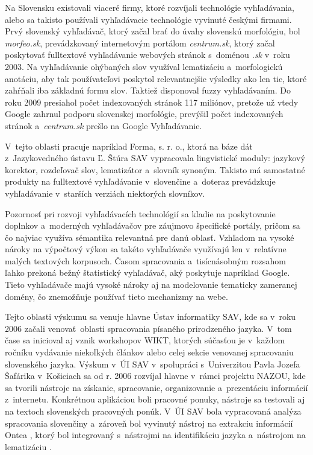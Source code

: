 \begin{multicols}{2}
Na Slovensku existovali viaceré firmy, ktoré rozvíjali
technológie vyhľadávania, alebo sa takisto používali vyhľadávacie technológie
vyvinuté českými firmami. Prvý slovenský vyhľadávač, ktorý začal brať
do úvahy slovenskú morfológiu\cite{f24}, bol \emph{morfeo.sk}, prevádzkovaný
internetovým portálom \emph{centrum.sk}, ktorý začal poskytovať fulltextové
vyhľadávanie webových stránok s~doménou \emph{.sk} v~roku 2003. Na vyhľadávanie
ohýbaných slov využíval lematizáciu a~morfologickú anotáciu, aby tak
používateľovi poskytol relevantnejšie výsledky ako len tie, ktoré zahŕňali iba
základnú formu slov. Taktiež disponoval fuzzy vyhľadávaním. Do roku 2009 presiahol počet
indexovaných stránok 117 miliónov, pretože už vtedy Google zahrnul podporu
slovenskej morfológie, prevýšil počet indexovaných stránok a~\emph{centrum.sk}
prešlo na Google Vyhľadávanie.

V~tejto oblasti pracuje napríklad Forma, s. r. o.\cite{f25}, ktorá na báze dát z~Jazykovedného ústavu Ľ. Štúra SAV vypracovala lingvistické moduly: jazykový korektor, rozdeľovač slov, lematizátor a~slovník synoným. Takisto má samostatné produkty na fulltextové vyhľadávanie v~slovenčine a~doteraz prevádzkuje vyhľadávanie v~starších verziách niektorých slovníkov.

Pozornosť pri rozvoji vyhľadávacích technológií sa kladie na poskytovanie doplnkov a~moderných vyhľadávačov pre záujmovo špecifické portály, pričom sa čo najviac využíva sémantika relevantná pre danú oblasť. Vzhľadom na vysoké nároky na výpočtový výkon sa takéto vyhľadávače využívajú len v~relatívne malých textových korpusoch. Časom spracovania a~tisícnásobným rozsahom ľahko prekoná bežný štatistický vyhľadávač, aký poskytuje napríklad Google. Tieto vyhľadávače majú vysoké nároky aj na modelovanie tematicky zameranej domény, čo znemožňuje používať tieto mechanizmy na webe. 

Tejto oblasti výskumu sa venuje hlavne Ústav informatiky SAV, kde sa v~roku 2006 začali venovať~oblasti spracovania písaného prirodzeného jazyka. V~tom čase sa inicioval aj vznik workshopov WIKT\cite{f26}, ktorých súčasťou je v~každom ročníku vydávanie niekoľkých článkov alebo celej sekcie venovanej spracovaniu slovenského jazyka. Výskum v~ÚI SAV v~spolupráci s~Univerzitou Pavla Jozefa Šafárika v~Košiciach sa od r. 2006 rozvíjal hlavne v~rámci projektu NAZOU\cite{f27}, kde sa tvorili nástroje na získanie, spracovanie, organizovanie a~prezentáciu informácií z~internetu. Konkrétnou aplikáciou boli pracovné ponuky, nástroje sa testovali aj na textoch slovenských pracovných ponúk. V~ÚI SAV bola vypracovaná analýza spracovania slovenčiny \cite{laclavik2007a} a~zároveň bol vyvinutý nástroj na extrakciu informácií Ontea\cite{f28} \cite{laclavik2007b,laclavik2009}, ktorý bol integrovaný s~nástrojmi na identifikáciu jazyka \cite{vojtek2006} a~nástrojom na lematizáciu \cite{krajci2007}.


\end{multicols}
